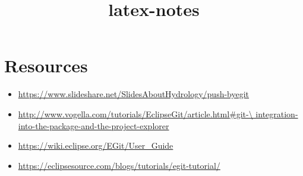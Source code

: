 \documentclass{report}
\title{latex-notes}
\begin{document}
\tableofcontents




\part{Resources}
\begin{itemize}
  \item \url{https://www.slideshare.net/SlidesAboutHydrology/push-byegit}
  \item \url{http://www.vogella.com/tutorials/EclipseGit/article.html#git-\
  integration-into-the-package-and-the-project-explorer}
  \item \url{https://wiki.eclipse.org/EGit/User_Guide}
  \item \url{https://eclipsesource.com/blogs/tutorials/egit-tutorial/}
\end{itemize}
\end{document}
